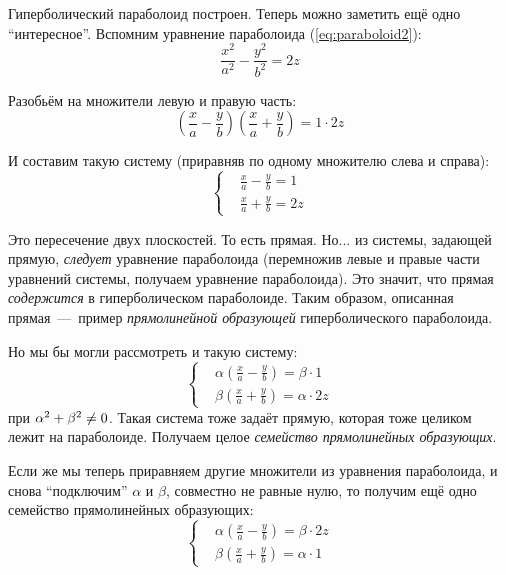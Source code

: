 \documentclass[a4paper,12pt]{article}
\begin{document}
  \medskip
  
  Гиперболический параболоид построен.
  Теперь можно заметить ещё одно ``интересное''.
  Вспомним уравнение параболоида (\ref{eq:paraboloid2}):
  \[
    \frac{x^2}{a^2} - \frac{y^2}{b^2} = 2z
  \]
  
  Разобьём на множители левую и правую часть:
  \[
    \left(\frac{x}{a} - \frac{y}{b}\right) \left(\frac{x}{a} + \frac{y}{b}\right) = 1 \cdot 2z
  \]
  
  И составим такую систему (приравняв по одному множителю слева и справа):
  \[
    \left\{
      \begin{aligned}
        &\frac{x}{a} - \frac{y}{b} = 1\\
        &\frac{x}{a} + \frac{y}{b} = 2z
      \end{aligned}
    \right.
  \]
  
  Это пересечение двух плоскостей.
  То есть прямая.
  Но... из системы, задающей прямую, \emph{следует} уравнение параболоида (перемножив левые и правые части уравнений системы, получаем уравнение параболоида).
  Это значит, что прямая \emph{содержится} в гиперболическом параболоиде.
  Таким образом, описанная прямая~---~пример \emph{прямолинейной образующей} гиперболического параболоида.
  
  Но мы бы могли рассмотреть и такую систему:
  \[
    \boxed{
      \left\{
        \begin{aligned}
          &\alpha\left(\frac{x}{a} - \frac{y}{b}\right) = \beta \cdot 1\\
          &\beta\left(\frac{x}{a} + \frac{y}{b}\right) = \alpha \cdot 2z
        \end{aligned}
      \right.
    }
  \]
  при $\alpha^2 \hm+ \beta^2 \hm{\not=} 0$.
  Такая система тоже задаёт прямую, которая тоже целиком лежит на параболоиде.
  Получаем целое \emph{семейство прямолинейных образующих}.
  
  Если же мы теперь приравняем другие множители из уравнения параболоида, и снова ``подключим'' $\alpha$ и $\beta$, совместно не равные нулю, то получим ещё одно семейство прямолинейных образующих:
  \[
    \boxed{
      \left\{
        \begin{aligned}
          &\alpha\left(\frac{x}{a} - \frac{y}{b}\right) = \beta \cdot 2z\\
          &\beta\left(\frac{x}{a} + \frac{y}{b}\right) = \alpha \cdot 1
        \end{aligned}
      \right.
    }
  \]
  
  \medskip
  
\end{document}
